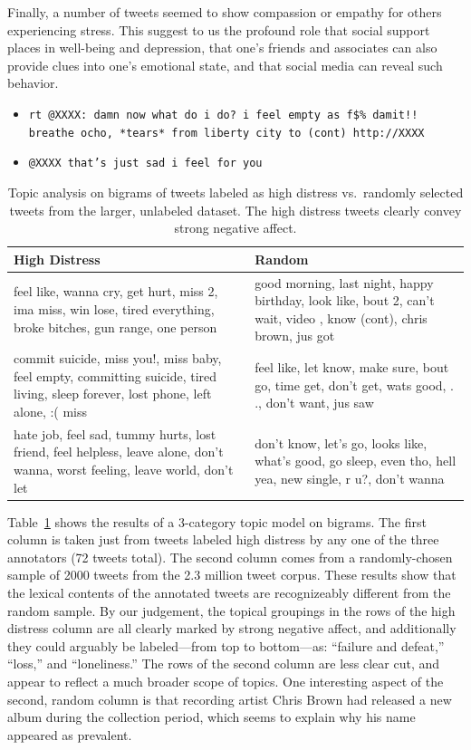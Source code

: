 \documentclass[11pt]{article}
\begin{document}
Finally, a number of tweets seemed to show compassion or empathy for others experiencing stress. This suggest to us the profound role that social support places in well-being and depression, that one's friends and associates can also provide clues into one's emotional state, and that social media can reveal such behavior.

\begin{itemize}
\footnotesize
\item \texttt{rt @XXXX: damn now what do i do? i feel empty as f\$\% damit!! breathe ocho, *tears* from liberty city to (cont) http://XXXX}
\item \texttt{@XXXX that's just sad i feel for you }
\end{itemize}


\begin{table}[h]
\footnotesize
\centering
\begin{tabular}{|>{\centering\arraybackslash}m{1.4in}| >{\centering\arraybackslash}m{1.2in}|}
\hline
High Distress & Random \\ \hline
feel like, wanna cry, get hurt, miss 2, ima miss, win lose, tired everything, broke bitches, gun range, one person & good morning, last night, happy birthday, look like, bout 2, can't wait, video , know (cont), chris brown, jus got \\ \hline
commit suicide, miss you!, miss baby, feel empty, committing suicide, tired living, sleep forever, lost phone, left alone, :( miss & feel like, let know, make sure, bout go, time get, don't get, wats good, . ., don't want, jus saw \\ \hline
hate job, feel sad, tummy hurts, lost friend, feel helpless, leave alone, don't wanna, worst feeling, leave world, don't let & don't know, let's go, looks like, what's good, go sleep, even tho, hell yea, new single, r u?, don't wanna \\ \hline
\end{tabular}
\caption{Topic analysis on bigrams of tweets labeled as high distress vs.\ randomly selected tweets from the larger, unlabeled dataset. The high distress tweets clearly convey strong negative affect.}
\label{tab:tm}
\end{table}

Table~\ref{tab:tm} shows the results of a 3-category topic model on bigrams.  The first column is taken just from tweets labeled high distress by any one of the three annotators (72 tweets total). The second column comes from a randomly-chosen sample of 2000 tweets from the 2.3 million tweet corpus. These results show that the lexical contents of the annotated tweets are recognizeably different from the random sample. By our judgement, the topical groupings in the rows of the high distress column are all clearly marked by strong negative affect, and additionally they could arguably be labeled---from top to bottom---as: ``failure and defeat,'' ``loss,'' and ``loneliness.''  The rows of the second column are less clear cut, and appear to reflect a much broader scope of topics. One interesting aspect of the second, random column is that recording artist Chris Brown had released a new album during the collection period, which seems to explain why his name appeared as prevalent.
\end{document}
